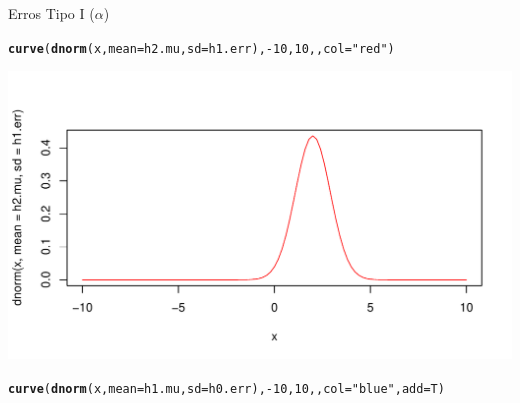 \documentclass{beamer}\usepackage[]{graphicx}\usepackage[]{color}
\makeatletter
\def\maxwidth{ %
  \ifdim\Gin@nat@width>\linewidth
    \linewidth
  \else
    \Gin@nat@width
  \fi
}
\newcommand{\hlnum}[1]{\textcolor[rgb]{0.686,0.059,0.569}{#1}}%
\newcommand{\hlstr}[1]{\textcolor[rgb]{0.192,0.494,0.8}{#1}}%
\newcommand{\hlopt}[1]{\textcolor[rgb]{0,0,0}{#1}}%
\newcommand{\hlstd}[1]{\textcolor[rgb]{0.345,0.345,0.345}{#1}}%
\newcommand{\hlkwc}[1]{\textcolor[rgb]{0.333,0.667,0.333}{#1}}%
\newcommand{\hlkwd}[1]{\textcolor[rgb]{0.737,0.353,0.396}{\textbf{#1}}}%
\newenvironment{kframe}{%
 \def\at@end@of@kframe{}%
 \ifinner\ifhmode%
  \def\at@end@of@kframe{\end{minipage}}%
  \begin{minipage}{\columnwidth}%
 \fi\fi%
 \def\FrameCommand##1{\hskip\@totalleftmargin \hskip-\fboxsep
 \colorbox{shadecolor}{##1}\hskip-\fboxsep
     \hskip-\linewidth \hskip-\@totalleftmargin \hskip\columnwidth}%
 \MakeFramed {\advance\hsize-\width
   \@totalleftmargin\z@ \linewidth\hsize
   \@setminipage}}%
 {\par\unskip\endMakeFramed%
 \at@end@of@kframe}
\newenvironment{knitrout}{}{} %
\renewenvironment{knitrout}{\setlength{\topsep}{0mm}}{}
\makeatother
\begin{document}
\begin{frame}[fragile]{Erros Tipo I ($\alpha$)}

\begin{knitrout}\tiny
{}\color{fgcolor}\begin{kframe}
\begin{alltt}
\hlkwd{curve}\hlstd{(}\hlkwd{dnorm}\hlstd{(x,} \hlkwc{mean} \hlstd{= h2.mu,} \hlkwc{sd} \hlstd{= h1.err),} \hlopt{-}\hlnum{10}\hlstd{,} \hlnum{10}\hlstd{, ,} \hlkwc{col} \hlstd{=} \hlstr{"red"}\hlstd{)}
\end{alltt}
\end{kframe}
\includegraphics[width=\maxwidth]{figure/erro_alfa_6-1} 
\begin{kframe}\begin{alltt}
\hlkwd{curve}\hlstd{(}\hlkwd{dnorm}\hlstd{(x,} \hlkwc{mean} \hlstd{= h1.mu,} \hlkwc{sd} \hlstd{= h0.err),} \hlopt{-}\hlnum{10}\hlstd{,} \hlnum{10}\hlstd{, ,} \hlkwc{col} \hlstd{=} \hlstr{"blue"}\hlstd{,} \hlkwc{add} \hlstd{= T)}
\end{alltt}


{\ttfamily\noindent\bfseries\color{errorcolor}{\#\# Error in dnorm(x, mean = h1.mu, sd = h0.err): object 'h0.err' not found}}\end{kframe}
\end{knitrout}

\end{frame}
\end{document}
